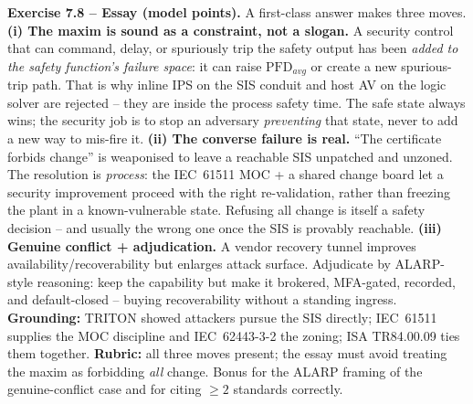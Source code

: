 \documentclass[11pt,a4paper]{article}
\begin{document}
\begin{solutionbox}
\textbf{Exercise 7.8 -- Essay (model points).}
A first-class answer makes three moves.
\textbf{(i) The maxim is sound as a constraint, not a slogan.} A security
control that can command, delay, or spuriously trip the safety output has been
\emph{added to the safety function's failure space}: it can raise
$\mathrm{PFD}_{avg}$ or create a new spurious-trip path. That is why inline IPS
on the SIS conduit and host AV on the logic solver are rejected -- they are
inside the process safety time. The safe state always wins; the security job is
to stop an adversary \emph{preventing} that state, never to add a new way to
mis-fire it.
\textbf{(ii) The converse failure is real.} ``The certificate forbids change''
is weaponised to leave a reachable SIS unpatched and unzoned. The resolution is
\emph{process}: the IEC~61511 MOC + a shared change board let a security
improvement proceed with the right re-validation, rather than freezing the
plant in a known-vulnerable state. Refusing all change is itself a safety
decision -- and usually the wrong one once the SIS is provably reachable.
\textbf{(iii) Genuine conflict + adjudication.} A vendor recovery tunnel
improves availability/recoverability but enlarges attack surface. Adjudicate by
ALARP-style reasoning: keep the capability but make it brokered, MFA-gated,
recorded, and default-closed -- buying recoverability without a standing
ingress. \textbf{Grounding:} TRITON showed attackers pursue the SIS directly;
IEC~61511 supplies the MOC discipline and IEC~62443-3-2 the zoning; ISA
TR84.00.09 ties them together.
\textbf{Rubric:} all three moves present; the essay must avoid treating the
maxim as forbidding \emph{all} change. Bonus for the ALARP framing of the
genuine-conflict case and for citing $\geq 2$ standards correctly.
\end{solutionbox}
\end{document}
